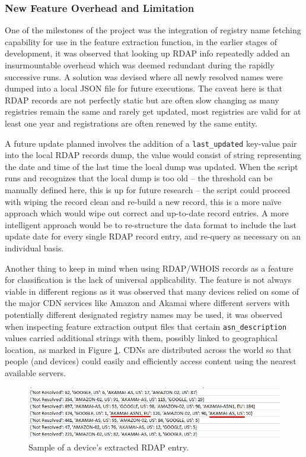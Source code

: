 \documentclass{article}
\begin{document}
\subsubsection{New Feature Overhead and Limitation}
One of the milestones of the project was the integration of registry
name fetching capability for use in the feature extraction function, in
the earlier stages of development, it was observed that looking up
RDAP info repeatedly added an insurmountable overhead which was deemed
redundant during the rapidly successive runs. A solution was devised
where all newly resolved names were dumped into a local JSON file for
future executions. The caveat here is that RDAP records are not
perfectly static but are often slow changing as many registries remain
the same and rarely get updated, most registries are valid for at least
one year and registrations are often renewed by the same entity.\newline

A future update planned involves the addition of a \texttt{last\_updated}
key-value pair into the local RDAP records dump, the value would consist
of string representing the date and time of the last time the local dump
was updated. When the script runs and recognizes that the local dump is
too old -- the threshold can be manually defined here, this is up for
future research -- the script could proceed with wiping the record clean
and re-build a new record, this is a more naïve approach which would
wipe out correct and up-to-date record entries. A more intelligent
approach would be to re-structure the data format to include the last
update date for every single RDAP record entry, and re-query as
necessary on an individual basis.\pagebreak

Another thing to keep in mind when using RDAP/WHOIS records as a feature
for classification is the lack of universal applicability. The feature
is not always viable in different regions as it was observed that many
devices relied on some of the major CDN services like Amazon and Akamai
where different servers with potentially different designated registry
names may be used, it was observed when inspecting feature extraction
output files that certain \texttt{asn\_description} values carried additional
strings with them, possibly linked to geographical location, as marked in Figure \ref{fig:CDNs}. CDNs are
distributed across the world so that people (and devices) could easily and efficiently
access content using the nearest available servers.

\begin{figure}[!ht]
    \centering
    \includegraphics[width=13cm]{InputSystem/CDNs.png}
    \caption{Sample of a device's extracted RDAP entry.} 
    \label{fig:CDNs}
\end{figure}
\end{document}
